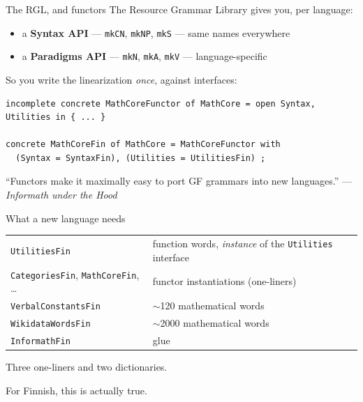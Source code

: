 \documentclass[10pt,aspectratio=169]{beamer}
\newcommand{\ok}[1]{\textcolor{good}{#1}}
\begin{document}
\begin{frame}[fragile]{The RGL, and functors}
  The Resource Grammar Library gives you, per language:
  \begin{itemize}
    \item a \textbf{Syntax API} --- \texttt{mkCN}, \texttt{mkNP}, \texttt{mkS} --- same names everywhere
    \item a \textbf{Paradigms API} --- \texttt{mkN}, \texttt{mkA}, \texttt{mkV} --- language-specific
  \end{itemize}

  So you write the linearization \emph{once}, against interfaces:

\begin{lstlisting}
incomplete concrete MathCoreFunctor of MathCore = open Syntax, Utilities in { ... }

concrete MathCoreFin of MathCore = MathCoreFunctor with
  (Syntax = SyntaxFin), (Utilities = UtilitiesFin) ;
\end{lstlisting}

  \vspace{0.3em}
  ``Functors make it maximally easy to port GF grammars into new languages.''
  \hfill --- \emph{Informath under the Hood}
\end{frame}

\begin{frame}{What a new language needs}
  \small
  \begin{center}
  \begin{tabular}{ll}
    \toprule
    \texttt{UtilitiesFin} & function words, \emph{instance} of the \texttt{Utilities} interface \\
    \texttt{CategoriesFin}, \texttt{MathCoreFin}, \dots & functor instantiations (one-liners) \\
    \texttt{VerbalConstantsFin} & $\sim$120 mathematical words \\
    \texttt{WikidataWordsFin} & $\sim$2000 mathematical words \\
    \texttt{InformathFin} & glue \\
    \bottomrule
  \end{tabular}
  \end{center}

  \vspace{1em}
  \begin{center}
  \Large Three one-liners and two dictionaries.
  \end{center}

  \vspace{0.5em}
  \begin{center}
  For Finnish, this is \ok{actually true}.
  \end{center}
\end{frame}
\end{document}
